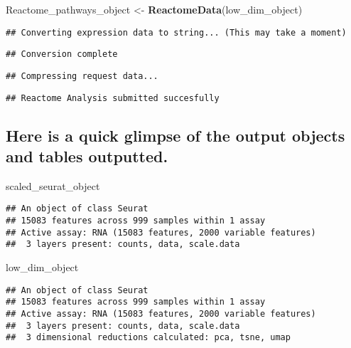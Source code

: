 \documentclass[
]{article}
\newenvironment{Shaded}{\begin{snugshade}}{\end{snugshade}}
\newcommand{\FunctionTok}[1]{\textcolor[rgb]{0.13,0.29,0.53}{\textbf{#1}}}
\newcommand{\NormalTok}[1]{#1}
\newcommand{\OtherTok}[1]{\textcolor[rgb]{0.56,0.35,0.01}{#1}}
\begin{document}
\begin{Shaded}
\begin{Highlighting}[]
\NormalTok{Reactome\_pathways\_object }\OtherTok{\textless{}{-}} \FunctionTok{ReactomeData}\NormalTok{(low\_dim\_object)}
\end{Highlighting}
\end{Shaded}

\begin{verbatim}
## Converting expression data to string... (This may take a moment)
\end{verbatim}

\begin{verbatim}
## Conversion complete
\end{verbatim}

\begin{verbatim}
## Compressing request data...
\end{verbatim}

\begin{verbatim}
## Reactome Analysis submitted succesfully
\end{verbatim}

\subsection{Here is a quick glimpse of the output objects and tables
outputted.}\label{here-is-a-quick-glimpse-of-the-output-objects-and-tables-outputted.}

\begin{Shaded}
\begin{Highlighting}[]
\NormalTok{scaled\_seurat\_object}
\end{Highlighting}
\end{Shaded}

\begin{verbatim}
## An object of class Seurat 
## 15083 features across 999 samples within 1 assay 
## Active assay: RNA (15083 features, 2000 variable features)
##  3 layers present: counts, data, scale.data
\end{verbatim}

\begin{Shaded}
\begin{Highlighting}[]
\NormalTok{low\_dim\_object}
\end{Highlighting}
\end{Shaded}

\begin{verbatim}
## An object of class Seurat 
## 15083 features across 999 samples within 1 assay 
## Active assay: RNA (15083 features, 2000 variable features)
##  3 layers present: counts, data, scale.data
##  3 dimensional reductions calculated: pca, tsne, umap
\end{verbatim}
\end{document}
